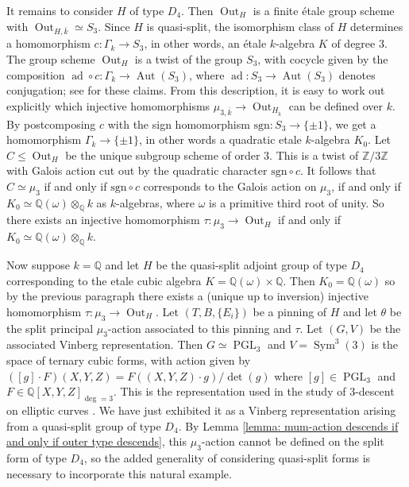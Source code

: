\documentclass{article} %
\numberwithin{equation}{section}
\theoremstyle{definition}
\DeclareMathOperator{\PGL}{PGL}
\DeclareMathOperator{\Aut}{Aut}
\DeclareMathOperator{\Out}{Out}
\DeclareMathOperator{\Sym}{Sym}
\newcommand{\Q}{\mathbb{Q}}
\newcommand{\Z}{\mathbb{Z}}
\DeclareMathOperator{\ad}{ad}
\begin{document}
    It remains to consider $H$ of type $D_4$.
    Then $\Out_H$ is a finite \'etale group scheme with $\Out_{H, \bar{k}} \simeq S_3$.
    Since $H$ is quasi-split, the isomorphism class of $H$ determines a homomorphism $c\colon \Gamma_k \rightarrow S_3$, in other words, an \'etale $k$-algebra $K$ of degree $3$.
    The group scheme $\Out_{H}$ is a twist of the group $S_3$, with cocycle given by the composition $\ad\circ c\colon \Gamma_k \rightarrow \Aut(S_3)$, where $\ad\colon S_3\rightarrow \Aut(S_3)$ denotes conjugation; see \cite[Section 2 and Section 5.2]{GanSavin-TwistedBhargavaCubes} for these claims.
    From this description, it is easy to work out explicitly which injective homomorphisms $\mu_{3, \bar{k}} \rightarrow \Out_{H_{\bar{k}}}$ can be defined over $k$. 
    By postcomposing $c$ with the sign homomorphism $\mathrm{sgn}\colon S_3\rightarrow \{\pm 1\}$, we get a homomorphism $\Gamma_k \rightarrow \{\pm 1\}$, in other words a quadratic etale $k$-algebra $K_0$.
    Let $C\leq \Out_H$ be the unique subgroup scheme of order $3$.
    This is a twist of $\Z/3\Z$ with Galois action cut out by the quadratic character $\mathrm{sgn}\circ c$.
    It follows that $C\simeq \mu_3$ if and only if $\mathrm{sgn}\circ c$ corresponds to the Galois action on $\mu_3$, if and only if $K_0 \simeq \Q(\omega)\otimes_{\Q} k$ as $k$-algebras, where $\omega$ is a primitive third root of unity.
    So there exists an injective homomorphism $\tau\colon \mu_3\rightarrow \Out_H$ if and only if $K_0\simeq \Q(\omega) \otimes_{\Q} k$.


    Now suppose $k =\Q$ and let $H$ be the quasi-split adjoint group of type $D_4$ corresponding to the etale cubic algebra $K = \Q(\omega) \times \Q$.
    Then $K_0 = \Q(\omega)$ so by the previous paragraph there exists a (unique up to inversion) injective homomorphism $\tau\colon\mu_3\rightarrow  \Out_H$.
    Let $(T,B,\{E_i\})$ be a pinning of $H$ and let $\theta$ be the split principal $\mu_3$-action associated to this pinning and $\tau$.
    Let $(G,V)$ be the associated Vinberg representation. 
    Then $G\simeq \PGL_3$ and $V = \Sym^3(3)$ is the space of ternary cubic forms, with action given by $([g]\cdot F)(X,Y,Z) = F((X,Y,Z)\cdot g)/\det(g)$ where $[g]\in \PGL_3$ and $F\in \Q[X,Y,Z]_{\deg=3}$.
    This is the representation used in the study of $3$-descent on elliptic curves \cite{BS-3Selmer}.
    We have just exhibited it as a Vinberg representation arising from a quasi-split group of type $D_4$. 
    By Lemma \ref{lemma: mum-action descends if and only if outer type descends}, this $\mu_3$-action cannot be defined on the split form of type $D_4$, so the added generality of considering quasi-split forms is necessary to incorporate this natural example.
\end{document}
